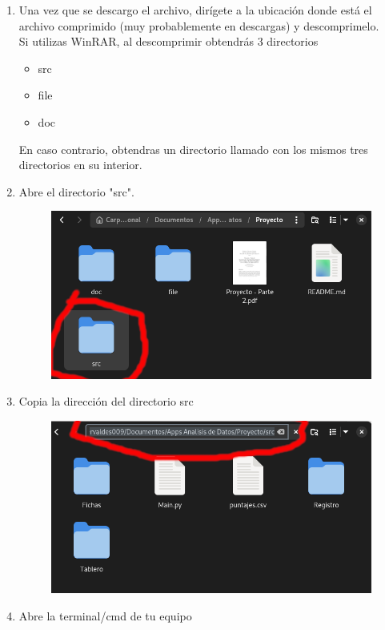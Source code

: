 \documentclass[12pt, Tahoma]{article}
\begin{document}
\begin{enumerate}
		\item  Una vez que se descargo el archivo, dirígete a la ubicación donde está el archivo comprimido (muy probablemente en descargas) y descomprimelo. \\ Si utilizas WinRAR, al descomprimir obtendrás 3 directorios
		\begin{itemize}
			\item src
			\item file
			\item doc
		\end{itemize}
		En caso contrario, obtendras un directorio llamado  con los mismos tres directorios en su interior.
		\item Abre el directorio "src".
			\begin{figure}[H]
				\centering
				\includegraphics[scale=2]{correr4.png}
			\end{figure}
		\item Copia la dirección del directorio src 
			\begin{figure}[H]
				\centering
				\includegraphics[scale=2]{correr3.png}
			\end{figure}
		\item Abre la terminal/cmd de tu equipo 

\end{enumerate}
\end{document}
